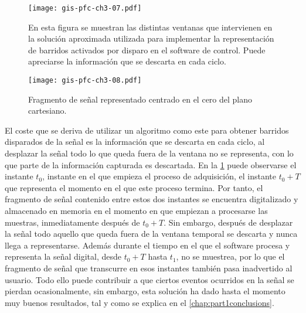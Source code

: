 \begin{figure}
	\begin{center}
		\texttt{[image: gis-pfc-ch3-07.pdf]}
	\end{center}
	\caption[Representación de barridos por disparo]{En esta figura se
	muestran las distintas ventanas que intervienen en la solución
	aproximada utilizada para implementar la representación de barridos
	activados por disparo en el software de control. Puede apreciarse
	la información que se descarta en cada ciclo.}
	\label{fig:sigmodtri}
\end{figure}

\begin{figure}
	\begin{center}
		\texttt{[image: gis-pfc-ch3-08.pdf]}
	\end{center}
	\caption[Representación del fragmento de señal]{Fragmento de señal
	representado centrado en el cero del plano cartesiano.}
	\label{fig:repmodtri}
\end{figure}

\llongpage{}

El coste que se deriva de utilizar un algoritmo como este para obtener
barridos disparados de la señal es la información que se descarta en cada
ciclo, al desplazar la señal todo lo que queda fuera de la ventana no se
representa, con lo que parte de la información capturada es descartada. En
la \cref{fig:sigmodtri} puede observarse el instante $t_0$, instante en el
que empieza el proceso de adquisición, el instante $t_0 + T$ que representa
el momento en el que este proceso termina. Por tanto, el fragmento de señal
contenido entre estos dos instantes se encuentra digitalizado y almacenado
en memoria en el momento en que empiezan a procesarse las muestras,
inmediatamente después de $t_0 + T$. Sin embargo, después de desplazar la
señal todo aquello que queda fuera de la ventana temporal se descarta y
nunca llega a representarse. Además durante el tiempo en el que el software
procesa y representa la señal digital, desde $t_0 + T$ hasta $t_1$, no se
muestrea, por lo que el fragmento de señal que transcurre en esos instantes
también pasa inadvertido al usuario. Todo ello puede contribuir a que
ciertos eventos ocurridos en la señal se pierdan ocasionalmente, sin
embargo, esta solución ha dado hasta el momento muy buenos resultados, tal
y como se explica en el \cref{chap:part1conclusions}.
